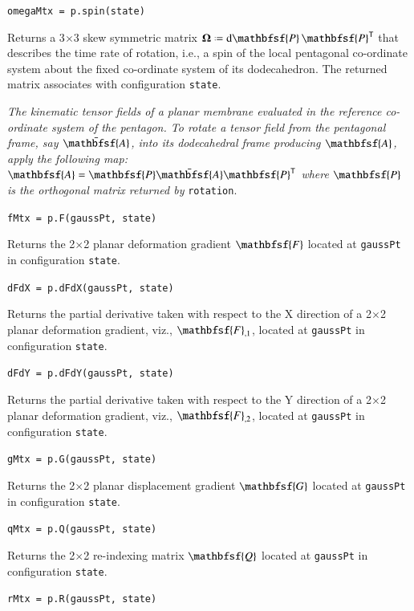 \medskip\noindent
\texttt{omegaMtx = p.spin(state)}

\medskip\noindent
Returns a 3$\times$3 skew symmetric matrix $\boldsymbol{\Omega} \defeq \mathrm{d} \mathbfsf{P} \, \mathbfsf{P}^{\mathsf{T}}$ that describes the time rate of
rotation, i.e., a spin of the local pentagonal co-ordinate system about the
fixed co-ordinate system of its dodecahedron.  The returned matrix associates with configuration \texttt{state}.

\medskip\noindent
\textit{The kinematic tensor fields of a planar membrane evaluated in the reference co-ordinate system of the pentagon.  To rotate a tensor field from the pentagonal frame, say $\bar{\mathbfsf{A}}$, into its dodecahedral frame producing $\mathbfsf{A}$, apply the following map: $\mathbfsf{A} = \mathbfsf{P} \bar{\mathbfsf{A}} \mathbfsf{P}^{\mathsf{T}}$ where $\mathbfsf{P}$ is the orthogonal matrix returned by\/} \texttt{rotation}.

\medskip\noindent
\texttt{fMtx = p.F(gaussPt, state)}

\medskip\noindent
Returns the 2$\times$2 planar deformation gradient $\mathbfsf{F}$ located at \texttt{gaussPt} in configuration \texttt{state}.

\medskip\noindent
\texttt{dFdX = p.dFdX(gaussPt, state)}

\medskip\noindent
Returns the partial derivative taken with respect to the X direction of a 2$\times$2 planar deformation gradient, viz., $\mathbfsf{F}_{,1}$, located at \texttt{gaussPt} in configuration \texttt{state}.

\medskip\noindent
\texttt{dFdY = p.dFdY(gaussPt, state)}

\medskip\noindent
Returns the partial derivative taken with respect to the Y direction of a 2$\times$2 planar deformation gradient, viz., $\mathbfsf{F}_{,2}$, located at \texttt{gaussPt} in configuration \texttt{state}.

\newpage
\medskip\noindent
\texttt{gMtx = p.G(gaussPt, state)}

\medskip\noindent
Returns the 2$\times$2 planar displacement gradient $\mathbfsf{G}$ located at \texttt{gaussPt} in configuration \texttt{state}.

\medskip\noindent
\texttt{qMtx = p.Q(gaussPt, state)}

\medskip\noindent
Returns the 2$\times$2 re-indexing matrix $\mathbfsf{Q}$ located at \texttt{gaussPt} in configuration \texttt{state}.

\medskip\noindent
\texttt{rMtx = p.R(gaussPt, state)}

